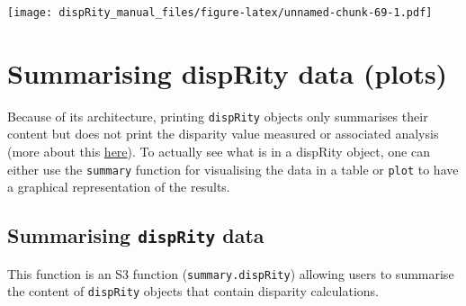 \documentclass[]{book}
\begin{document}
\texttt{[image: dispRity\_manual\_files/figure-latex/unnamed-chunk-69-1.pdf]}

\hypertarget{summarising-disprity-data-plots}{%
\section{Summarising dispRity data (plots)}\label{summarising-disprity-data-plots}}

Because of its architecture, printing \texttt{dispRity} objects only summarises their content but does not print the disparity value measured or associated analysis (more about this \protect\hyperlink{manipulating-dispRity-objects}{here}).
To actually see what is in a dispRity object, one can either use the \texttt{summary} function for visualising the data in a table or \texttt{plot} to have a graphical representation of the results.

\hypertarget{summarising-disprity-data}{%
\subsection{\texorpdfstring{Summarising \texttt{dispRity} data}{Summarising dispRity data}}\label{summarising-disprity-data}}

This function is an S3 function (\texttt{summary.dispRity}) allowing users to summarise the content of \texttt{dispRity} objects that contain disparity calculations.
\end{document}
